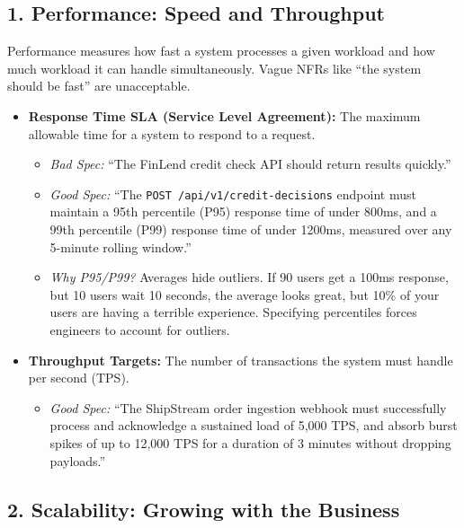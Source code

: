 \subsection{1. Performance: Speed and
Throughput}\label{performance-speed-and-throughput}

Performance measures how fast a system processes a given workload and
how much workload it can handle simultaneously. Vague NFRs like ``the
system should be fast'' are unacceptable.

\begin{itemize}
\tightlist
\item
  \textbf{Response Time SLA (Service Level Agreement):} The maximum
  allowable time for a system to respond to a request.

  \begin{itemize}
  \tightlist
  \item
    \emph{Bad Spec:} ``The FinLend credit check API should return
    results quickly.''
  \item
    \emph{Good Spec:} ``The \texttt{POST\ /api/v1/credit-decisions}
    endpoint must maintain a 95th percentile (P95) response time of
    under 800ms, and a 99th percentile (P99) response time of under
    1200ms, measured over any 5-minute rolling window.''
  \item
    \emph{Why P95/P99?} Averages hide outliers. If 90 users get a 100ms
    response, but 10 users wait 10 seconds, the average looks great, but
    10\% of your users are having a terrible experience. Specifying
    percentiles forces engineers to account for outliers.
  \end{itemize}
\item
  \textbf{Throughput Targets:} The number of transactions the system
  must handle per second (TPS).

  \begin{itemize}
  \tightlist
  \item
    \emph{Good Spec:} ``The ShipStream order ingestion webhook must
    successfully process and acknowledge a sustained load of 5,000 TPS,
    and absorb burst spikes of up to 12,000 TPS for a duration of 3
    minutes without dropping payloads.''
  \end{itemize}
\end{itemize}

\subsection{2. Scalability: Growing with the
Business}\label{scalability-growing-with-the-business}

